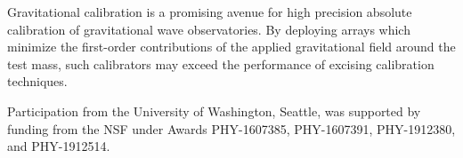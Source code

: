 \documentclass[superscriptaddress, twocolumn, prd]{revtex4-1}
\begin{document}
Gravitational calibration is a promising avenue for high precision absolute calibration of gravitational wave observatories. By deploying arrays which minimize the first-order contributions of the applied gravitational field around the test mass, such calibrators may exceed the performance of excising calibration techniques.

\begin{acknowledgements}

Participation from the University of Washington, Seattle, was supported by funding from the NSF under Awards PHY-1607385, PHY-1607391, PHY-1912380, and PHY-1912514.


\end{acknowledgements}


 

\end{document}
